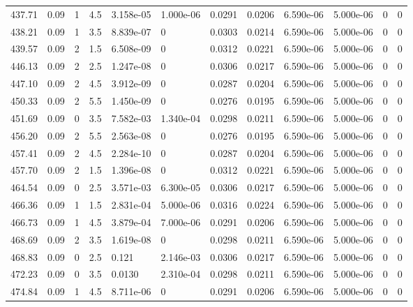 \documentclass[preview]{standalone}
\begin{document}
{{{{{\begin{tabular}{L{1.2cm}C{1.2cm} C{0.3cm}C{0.5cm} C{1.4cm}C{1.4cm} C{1.4cm}C{1.4cm} C{1.6cm}C{1.6cm} C{1.6cm}C{1.6cm}}
  437.71  &  0.09  & 1     & 4.5 &  3.158e-05  & 1.000e-06  &  0.0291&   0.0206& 6.590e-06 & 5.000e-06   &  0 & 0  \\ 
  438.21  &  0.09  & 1     & 3.5 &  8.839e-07  & 0  &  0.0303&   0.0214& 6.590e-06 & 5.000e-06   &  0 & 0  \\ 
  439.57  &  0.09  & 2     & 1.5 &  6.508e-09  & 0  &  0.0312&   0.0221& 6.590e-06 & 5.000e-06   &  0 & 0  \\ 
  446.13  &  0.09  & 2     & 2.5 &  1.247e-08  & 0  &  0.0306&   0.0217& 6.590e-06 & 5.000e-06   &  0 & 0  \\ 
  447.10  &  0.09  & 2     & 4.5 &  3.912e-09  & 0  &  0.0287&   0.0204& 6.590e-06 & 5.000e-06   &  0 & 0  \\ 
  450.33  &  0.09  & 2     & 5.5 &  1.450e-09  & 0  &  0.0276&   0.0195& 6.590e-06 & 5.000e-06   &  0 & 0  \\ 
  451.69  &  0.09  & 0     & 3.5 &  7.582e-03  & 1.340e-04  &  0.0298&   0.0211& 6.590e-06 & 5.000e-06   &  0 & 0  \\ 
  456.20  &  0.09  & 2     & 5.5 &  2.563e-08  & 0  &  0.0276&   0.0195& 6.590e-06 & 5.000e-06   &  0 & 0  \\ 
  457.41  &  0.09  & 2     & 4.5 &  2.284e-10  & 0  &  0.0287&   0.0204& 6.590e-06 & 5.000e-06   &  0 & 0  \\ 
  457.70  &  0.09  & 2     & 1.5 &  1.396e-08  & 0  &  0.0312&   0.0221& 6.590e-06 & 5.000e-06   &  0 & 0  \\ 
  464.54  &  0.09  & 0     & 2.5 &  3.571e-03  & 6.300e-05  &  0.0306&   0.0217& 6.590e-06 & 5.000e-06   &  0 & 0  \\ 
  466.36  &  0.09  & 1     & 1.5 &  2.831e-04  & 5.000e-06  &  0.0316&   0.0224& 6.590e-06 & 5.000e-06   &  0 & 0  \\ 
  466.73  &  0.09  & 1     & 4.5 &  3.879e-04  & 7.000e-06  &  0.0291&   0.0206& 6.590e-06 & 5.000e-06   &  0 & 0  \\ 
  468.69  &  0.09  & 2     & 3.5 &  1.619e-08  & 0  &  0.0298&   0.0211& 6.590e-06 & 5.000e-06   &  0 & 0  \\ 
  468.83  &  0.09  & 0     & 2.5 &  0.121  & 2.146e-03  &  0.0306&   0.0217& 6.590e-06 & 5.000e-06   &  0 & 0  \\ 
  472.23  &  0.09  & 0     & 3.5 &  0.0130  & 2.310e-04  &  0.0298&   0.0211& 6.590e-06 & 5.000e-06   &  0 & 0  \\ 
  474.84  &  0.09  & 1     & 4.5 &  8.711e-06  & 0  &  0.0291&   0.0206& 6.590e-06 & 5.000e-06   &  0 & 0  \\ 

\end{tabular}}}}}}
\end{document}
